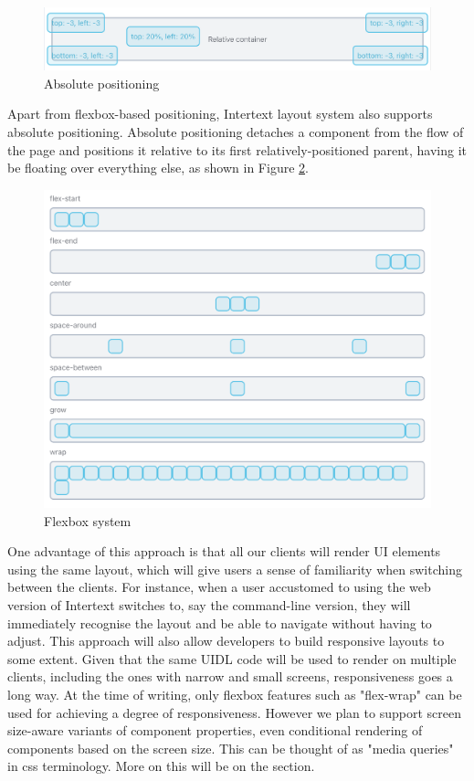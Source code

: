 \begin{figure}[H]
  \centering
  \includegraphics[width=13cm]{thesis/paper/images/absolute.png}
  \caption{Absolute positioning}%
  \label{fig:flexbox_props}%
\end{figure}

Apart from flexbox-based positioning, Intertext layout system also supports absolute positioning. Absolute positioning detaches a component from the flow of the page and positions it relative to its first relatively-positioned parent, having it be floating over everything else, as shown in Figure \ref{fig:absolute_positioning}.

\begin{figure}
  \centering
  \includegraphics[width=13cm]{thesis/paper/images/responsive.png}
  \caption{Flexbox system}%
  \label{fig:absolute_positioning}%
\end{figure}

One advantage of this approach is that all our clients will render UI elements using the same layout, which will give users a sense of familiarity when switching between the clients. For instance, when a user accustomed to using the web version of Intertext switches to, say the command-line version, they will immediately recognise the layout and be able to navigate without having to adjust. This approach will also allow developers to build responsive layouts to some extent. Given that the same UIDL code will be used to render on multiple clients, including the ones with narrow and small screens, responsiveness goes a long way. At the time of writing, only flexbox features such as "flex-wrap" can be used for achieving a degree of responsiveness. However we plan to support screen size-aware variants of component properties, even conditional rendering of components based on the screen size. This can be thought of as "media queries" in css terminology. More on this will be on the  section.

